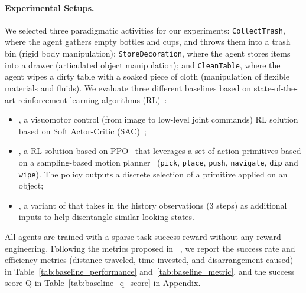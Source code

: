 \paragraph{Experimental Setups.} We selected three paradigmatic activities for our experiments: 
\texttt{CollectTrash}, where the agent gathers empty bottles and cups, and throws them into a trash bin (rigid body manipulation); \texttt{StoreDecoration}, where the agent stores items into a drawer (articulated object manipulation); and \texttt{CleanTable}, where the agent wipes a dirty table with a soaked piece of cloth (manipulation of flexible materials and fluids). 
We evaluate three different baselines based on state-of-the-art reinforcement learning algorithms (RL)~\cite{barto2003recent}: 
\begin{itemize}
    \item \rlvmc, a visuomotor control (from image to low-level joint commands) RL solution based on Soft Actor-Critic (SAC)~\cite{haarnoja2018soft};
    \item \rlprim, a RL solution based on PPO~\cite{schulman2017proximal} that leverages a set of action primitives based on a sampling-based motion planner~\cite{lavalle2006planning,kuffner2000rrt,Jordan.Perez.ea:CSAIL13} (\texttt{pick}, \texttt{place}, \texttt{push}, \texttt{navigate}, \texttt{dip} and \texttt{wipe}). The policy outputs a discrete selection of a primitive applied on an object;
    \item \rlprimhist, a variant of \rlprim that takes in the history observations (3 steps) as additional inputs to help disentangle similar-looking states.    
\end{itemize} 

All agents are trained with a sparse task success reward without any reward engineering. Following the metrics proposed in \oldbenchmark~\cite{srivastava2021behavior}, we report the success rate and efficiency metrics (distance traveled, time invested, and disarrangement caused) in Table~\ref{tab:baseline_performance} and~\ref{tab:baseline_metric}, and the success score Q in Table~\ref{tab:baseline_q_score} in Appendix. 

